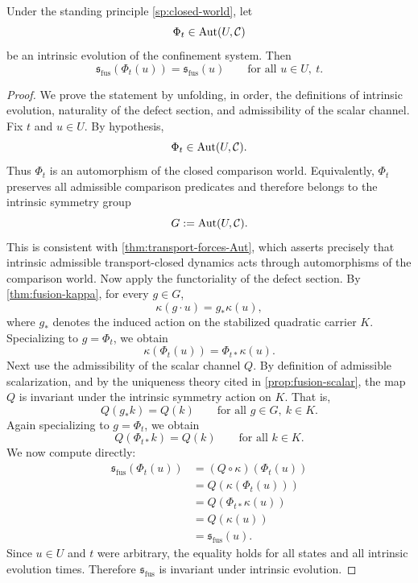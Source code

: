 \begin{theorem}
	\label{thm:fusion-invariance}
	Under the standing principle \cref{sp:closed-world}, let
	\[
		\Phi_t\in \operatorname{Aut}(U,\mathcal C)
	\]
	be an intrinsic evolution of the confinement system.
	Then
	\[
		\mathfrak s_{\mathrm{fus}}(\Phi_t(u))=\mathfrak s_{\mathrm{fus}}(u)
		\qquad
		\text{for all }u\in U,\ t.
	\]
\end{theorem}
\begin{proof}
	We prove the statement by unfolding, in order, the definitions of
	intrinsic evolution, naturality of the defect section, and admissibility
	of the scalar channel.
	Fix \(t\) and \(u\in U\).
	By hypothesis,
	\[
		\Phi_t\in \operatorname{Aut}(U,\mathcal C).
	\]
	Thus \(\Phi_t\) is an automorphism of the closed comparison world.
	Equivalently, \(\Phi_t\) preserves all admissible comparison predicates
	and therefore belongs to the intrinsic symmetry group
	\[
		G:=\operatorname{Aut}(U,\mathcal C).
	\]
	This is consistent with \cref{thm:transport-forces-Aut}, which asserts
	precisely that intrinsic admissible transport-closed dynamics acts
	through automorphisms of the comparison world.
	Now apply the functoriality of the defect section.
	By \cref{thm:fusion-kappa}, for every \(g\in G\),
	\[
		\kappa(g\cdot u)=g_*\kappa(u),
	\]
	where \(g_*\) denotes the induced action on the stabilized quadratic
	carrier \(K\).
	Specializing to \(g=\Phi_t\), we obtain
	\[
		\kappa(\Phi_t(u))=\Phi_{t*}\kappa(u).
	\]
	Next use the admissibility of the scalar channel \(Q\).
	By definition of admissible scalarization, and by the uniqueness theory
	cited in \cref{prop:fusion-scalar}, the map \(Q\) is invariant under the
	intrinsic symmetry action on \(K\). That is,
	\[
		Q(g_*k)=Q(k)
		\qquad
		\text{for all }g\in G,\ k\in K.
	\]
	Again specializing to \(g=\Phi_t\), we obtain
	\[
		Q(\Phi_{t*}k)=Q(k)
		\qquad
		\text{for all }k\in K.
	\]
	We now compute directly:
	\begin{align*}
		\mathfrak s_{\mathrm{fus}}(\Phi_t(u))
		 & =(Q\circ\kappa)(\Phi_t(u)) \\
		 & =Q(\kappa(\Phi_t(u)))      \\
		 & =Q(\Phi_{t*}\kappa(u))     \\
		 & =Q(\kappa(u))              \\
		 & =\mathfrak s_{\mathrm{fus}}(u).
	\end{align*}
	Since \(u\in U\) and \(t\) were arbitrary, the equality holds for all
	states and all intrinsic evolution times.
	Therefore \(\mathfrak s_{\mathrm{fus}}\) is invariant under intrinsic evolution.
\end{proof}
